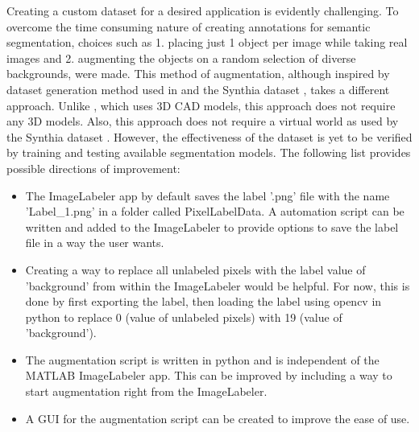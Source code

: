 \documentclass[paper=a4,11pt,parskip=half,toc=listof]{scrartcl}
\begin{document}
Creating a custom dataset for a desired application is evidently challenging. To overcome the time consuming nature of creating annotations for semantic segmentation, choices such as 1. placing just 1 object per image while taking real images and 2. augmenting the objects on a random selection of diverse backgrounds, were made. This method of augmentation, although inspired by dataset generation method used in \cite{DBLP:journals/corr/abs-1709-00849} and the Synthia dataset \cite{RosCVPR16}, takes a different approach. Unlike \cite{DBLP:journals/corr/abs-1709-00849}, which uses 3D CAD models, this approach does not require any 3D models. Also, this approach does not require a virtual world as used by the Synthia dataset \cite{RosCVPR16}. However, the effectiveness of the dataset is yet to be verified by training and testing available segmentation models.
The following list provides possible directions of improvement:
	\begin{itemize}
		\item The ImageLabeler app by default saves the label '.png' file with the name 'Label\_1.png' in a folder called PixelLabelData. A automation script can be written and added to the ImageLabeler to provide options to save the label file in a way the user wants.
		\item Creating a way to replace all unlabeled pixels with the label value of 'background' from within the ImageLabeler would be helpful. For now, this is done by first exporting the label, then loading the label using opencv in python to replace 0 (value of unlabeled pixels) with 19 (value of 'background').
		\item The augmentation script is written in python and is independent of the MATLAB ImageLabeler app. This can be improved by including a way to start augmentation right from the ImageLabeler.
		\item A GUI for the augmentation script can be created to improve the ease of use.
	\end{itemize}

\newpage
{}



\end{document}
